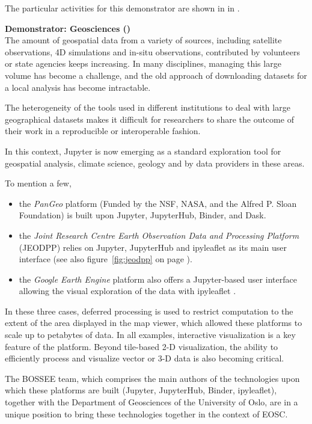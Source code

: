     The particular activities for this demonstrator are shown in
   in .

\medskip
\noindent\textbf{Demonstrator: Geosciences ()}\label{sec:concept-demonstrators-geo}\\
The amount of geospatial data from a variety of sources, including satellite observations, 4D simulations and in-situ observations, contributed by volunteers
or state agencies keeps increasing. In many disciplines, managing this large volume
has become a challenge, and the old approach of downloading datasets for a local
analysis has become intractable.

The heterogeneity of the tools used in different institutions to deal with
large geographical datasets makes it difficult for researchers to share the outcome
of their work in a reproducible or interoperable fashion.

In this context, Jupyter is now emerging as a standard exploration tool for
geospatial analysis, climate science, geology and by data providers in these areas.

To mention a few,
\begin{itemize}
\item
   the \emph{PanGeo} platform \cite{Pangeo2018} (Funded by the NSF, NASA, and the
   Alfred P. Sloan Foundation) is built upon Jupyter, JupyterHub, Binder, and Dask.
\item
   the \emph{Joint Research Centre Earth Observation Data and Processing Platform}
   (JEODPP) \cite{Soille2018} relies on Jupyter, JupyterHub and ipyleaflet as
   its main user interface (see also figure~\ref{fig:jeodpp} on page \pageref{fig:jeodpp}).
\item
   the \emph{Google Earth Engine} platform also offers a Jupyter-based user
   interface allowing the visual exploration of the data with ipyleaflet
   \cite{GEEJupyterLeaflet2017}.
\end{itemize}

In these three cases, deferred processing is used to restrict computation to
the extent of the area displayed in the map viewer, which allowed these
platforms to scale up to petabytes of data. In all examples, interactive
visualization is a key feature of the platform. Beyond tile-based
2-D visualization, the ability to efficiently process and visualize vector
or 3-D  data is also becoming critical.

The BOSSEE team, which comprises the main authors of the technologies upon
which these platforms are built (Jupyter, JupyterHub, Binder, ipyleaflet),
together with the Department of Geosciences of the University of Oslo, are
in a unique position to bring these technologies together in the context of
EOSC.

